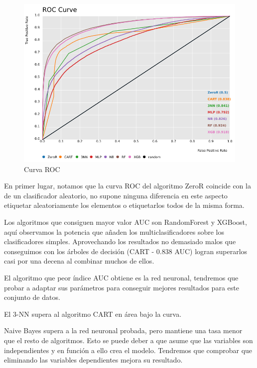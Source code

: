 \documentclass[a4paper, 20pt]{article}
\begin{document}
\begin{figure}[H]
    \centering
    \includegraphics[width=1\textwidth]{ROC}
    \caption{Curva ROC}
    \label{fig:ROC}
\end{figure}

En primer lugar, notamos que la curva ROC del algoritmo ZeroR coincide con la de un clasificador aleatorio, no supone ninguna diferencia en este aspecto etiquetar aleatoriamente los elementos o etiquetarlos todos de la misma forma.

Los algoritmos que consiguen mayor valor AUC son RandomForest y XGBoost, aquí observamos la potencia que añaden los multiclasificadores sobre los clasificadores simples. Aprovechando los resultados no demasiado malos que conseguimos con los árboles de decisión (CART - 0.838 AUC) logran superarlos casi por una decena al combinar muchos de ellos.

El algoritmo que peor índice AUC obtiene es la red neuronal, tendremos que probar a adaptar sus parámetros para conseguir mejores resultados para este conjunto de datos.

El 3-NN supera al algoritmo CART en área bajo la curva. %

Naive Bayes supera a la red neuronal probada, pero mantiene una tasa menor que el resto de algoritmos. Esto se puede deber a que asume que las variables son independientes y en función a ello crea el modelo. Tendremos que comprobar que eliminando las variables dependientes mejora su resultado. %

\end{document}
